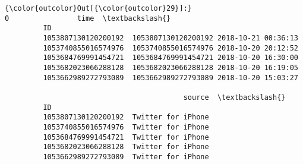 \documentclass[11pt]{article}
\begin{document}
\begin{Verbatim}[commandchars=\\\{\}]
{\color{outcolor}Out[{\color{outcolor}29}]:}                                        0                time  \textbackslash{}
         ID                                                             
         1053807130120200192  1053807130120200192 2018-10-21 00:36:13   
         1053740855016574976  1053740855016574976 2018-10-20 20:12:52   
         1053684769991454721  1053684769991454721 2018-10-20 16:30:00   
         1053682023066288128  1053682023066288128 2018-10-20 16:19:05   
         1053662989272793089  1053662989272793089 2018-10-20 15:03:27   
         
                                          source  \textbackslash{}
         ID                                        
         1053807130120200192  Twitter for iPhone   
         1053740855016574976  Twitter for iPhone   
         1053684769991454721  Twitter for iPhone   
         1053682023066288128  Twitter for iPhone   
         1053662989272793089  Twitter for iPhone   
         

\end{Verbatim}
\end{document}

